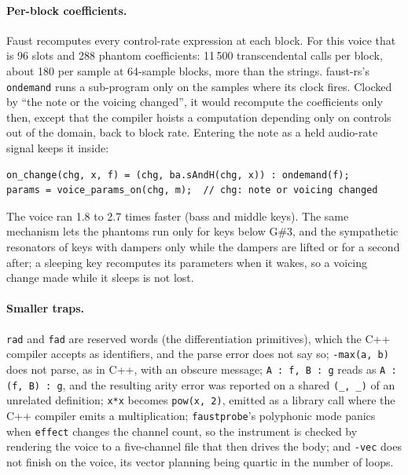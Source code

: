 \documentclass[10pt,a4paper,twocolumn]{article}
\newcommand{\faustrs}{faust-rs}
\newcommand{\probe}{\texttt{faustprobe}}
\newcommand{\code}[1]{\texttt{#1}}
\begin{document}
\paragraph{Per-block coefficients.} Faust recomputes every control-rate expression at each block. For this voice that is 96 slots and 288 phantom coefficients: 11\,500 transcendental calls per block, about 180 per sample at 64-sample blocks, more than the strings. \faustrs{}'s \code{ondemand} runs a sub-program only on the samples where its clock fires. Clocked by ``the note or the voicing changed'', it would recompute the coefficients only then, except that the compiler hoists a computation depending only on controls out of the domain, back to block rate. Entering the note as a held audio-rate signal keeps it inside:
\begin{lstlisting}
on_change(chg, x, f) = (chg, ba.sAndH(chg, x)) : ondemand(f);
params = voice_params_on(chg, m);  // chg: note or voicing changed
\end{lstlisting}
The voice ran 1.8 to 2.7 times faster (bass and middle keys). The same mechanism lets the phantoms run only for keys below G\#3, and the sympathetic resonators of keys with dampers only while the dampers are lifted or for a second after; a sleeping key recomputes its parameters when it wakes, so a voicing change made while it sleeps is not lost.

\paragraph{Smaller traps.} \code{rad} and \code{fad} are reserved words (the differentiation primitives), which the C++ compiler accepts as identifiers, and the parse error does not say so; \code{-max(a, b)} does not parse, as in C++, with an obscure message; \code{A : f, B : g} reads as \code{A : (f, B) : g}, and the resulting arity error was reported on a shared \code{(\_, \_)} of an unrelated definition; \code{x*x} becomes \code{pow(x, 2)}, emitted as a library call where the C++ compiler emits a multiplication; \probe{}'s polyphonic mode panics when \code{effect} changes the channel count, so the instrument is checked by rendering the voice to a five-channel file that then drives the body; and \code{-vec} does not finish on the voice, its vector planning being quartic in the number of loops.
\end{document}
